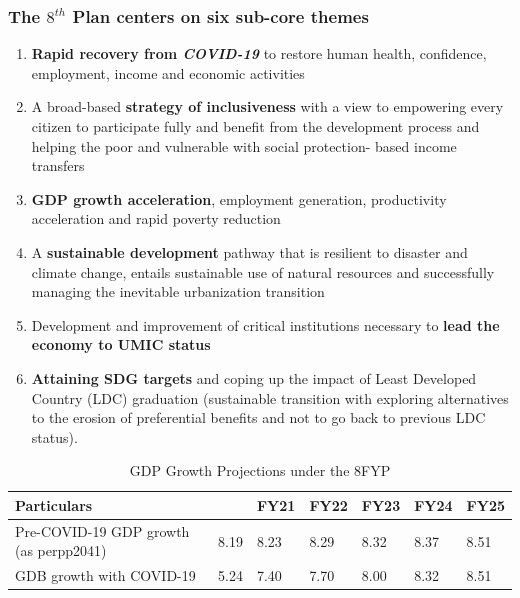 \subsubsection{The $8^{th}$ Plan centers on six sub-core themes}
\begin{enumerate}
	\item \textbf{Rapid recovery from \textit{COVID-19}} to restore human health, confidence, 
	employment, income and economic activities
	
	\item A broad-based \textbf{strategy of inclusiveness} with a view to empowering every citizen 
	to participate fully and benefit from the development process and helping the poor and 
	vulnerable with social protection- based income transfers
	
	\item \textbf{GDP growth acceleration}, employment generation, productivity acceleration 
	and rapid poverty reduction
	
	\item A \textbf{sustainable development} pathway that is resilient to disaster and climate change, 
	entails sustainable use of natural resources and successfully managing the inevitable 
	urbanization transition
	
	\item Development and improvement of critical institutions necessary to 
	\textbf{lead the economy to UMIC status}
	
	\item \textbf{Attaining SDG targets} and coping up the impact of Least Developed Country (LDC) 
	graduation (sustainable transition with exploring alternatives to the erosion of preferential 
	benefits and not to go back to previous LDC status).
	
\end{enumerate}

\begin{table}[h!]
\renewcommand{\arraystretch}{1.5}
\centering
\caption{GDP Growth Projections under the 8FYP}
\label{Table-2}
\begin{tabular}{ p{3cm} p{1.5cm} p{1cm} p{1.3cm} p{1.3cm} p{1.3cm} p{1.3cm}}
\bottomrule
\rowcolor{gray!30}
Particulars & \centering{FY20 (Actual)} & FY21 & FY22 & FY23 & FY24 & FY25 \\
\toprule
Pre-COVID-19 GDP growth (as perpp2041) 	& 8.19	& 8.23	& 8.29	& 8.32	& 8.37	& 8.51 \\
\midrule
GDB growth with COVID-19					& 5.24	& 7.40	& 7.70	& 8.00	& 8.32	& 8.51 \\
\bottomrule
\end{tabular}
\end{table}



